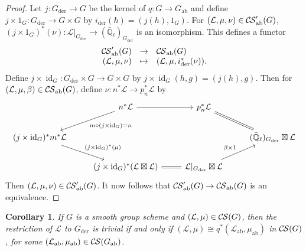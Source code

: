 \documentclass[10pt]{amsart}
\theoremstyle{plain}
\newtheorem{corollary}[theorem]{Corollary}
\theoremstyle{definition}
\newcommand{\EE}{\mathbb{\bar Q}_\ell}
\DeclareMathOperator{\id}{id}
\newcommand{\der}{_{\operatorname{der}}}
\newcommand{\ab}{_{\operatorname{ab}}}
\newcommand{\cs}[1]{{\mathcal{#1}}}
\newcommand{\CS}{{\mathcal{C\hskip-0.8pt S}}}
\newcommand{\CSab}{\CS_{\operatorname{ab}}}
\begin{document}
\begin{proof}
Let $j : G\der \to G$ be the kernel of $q:G \to G\ab$ and define $j\times 1_G : G\der \to G\times G$ by $i\der(h) = (j(h),1_G)$. 
For $(\cs{L},\mu,\nu)\in \CSab'(G)$, $(j\times 1_G)^*(\nu) : \cs{L}\vert_{G\der} \to (\EE)_{G\der}$ is an isomorphism.
This defines a functor
\[
\begin{array}{rcl}
\CSab'(G) &\to& \CSab(G) \\
(\cs{L},\mu,\nu) &\mapsto& (\cs{L},\mu,i\der^*(\nu)).
\end{array}
\]
Define $j\times\id_G: G\der\times G\to G\times G$ by $j\times\id_G(h,g) = (j(h),g)$.
Then for $(\cs{L},\mu,\beta) \in \CSab(G)$, define $\nu : n^*\cs{L} \to p_n^*\cs{L}$ by
\[
\begin{tikzcd}
& n^* \cs{L} \arrow{dl}{m\circ (j\times\id_G) = n} \arrow{r} & p_n^*\cs{L} &  \\ 
(j\times\id_G)^* m^* \cs{L} \arrow{dr}{(j\times\id_G)^*(\mu)} &&& (\EE)_{G\der} \boxtimes \cs{L} \arrow[equal]{ul} \\
& (j\times\id_G)^*(\cs{L}\boxtimes\cs{L}) \arrow[equal]{r} & \cs{L}\vert_{G\der}\boxtimes \cs{L} \arrow{ur}{\beta\times 1}
\end{tikzcd}
\]
Then $(\cs{L},\mu,\nu)\in \CSab'(G)$.
It now follows that $\CSab'(G) \to \CSab(G)$ is an equivalence.
\end{proof}

\begin{corollary} 
If $G$ is a smooth group scheme and $(\cs{L},\mu) \in \CS(G)$, then
the restriction of $\cs{L}$ to $G\der$ is trivial if and only if $(\cs{L},\mu) \cong q^*(\cs{L}\ab,\mu\ab)$ in $\CS(G)$, for some $(\cs{L}\ab,\mu\ab) \in \CS(G\ab)$. 
\end{corollary}
\end{document}
